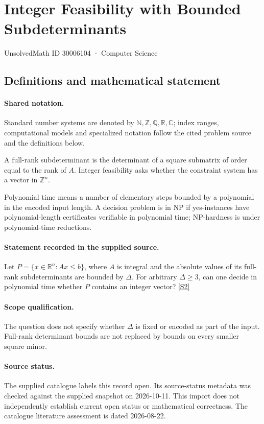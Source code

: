 \documentclass[11pt]{article}
\newcommand{\sref}[2]{\hyperlink{source:#1:#2}{[S#2]}}
\begin{document}
\setcounter{section}{30006103}
\section{Integer Feasibility with Bounded Subdeterminants}\label{30006104}
{\small\sffamily UnsolvedMath ID 30006104 · Computer Science}
\subsection{Definitions and mathematical statement}

\paragraph{Shared notation.}Standard number systems are denoted by $\mathbb N,\mathbb Z,\mathbb Q,\mathbb R,\mathbb C$; index ranges, computational models and specialized notation follow the cited problem source and the definitions below.


A full-rank subdeterminant is the determinant of a square submatrix of order equal to the rank of $A$. Integer feasibility asks whether the constraint system has a vector in $\mathbb Z^n$.

Polynomial time means a number of elementary steps bounded by a polynomial in the encoded input length. A decision problem is in $\mathrm{NP}$ if yes-instances have polynomial-length certificates verifiable in polynomial time; NP-hardness is under polynomial-time reductions.
\paragraph{Statement recorded in the supplied source.}
Let $P=\{x\in\mathbb R^n:Ax\leq b\}$, where $A$ is integral and the absolute values of its full-rank subdeterminants are bounded by $\Delta$. For arbitrary $\Delta\geq3$, can one decide in polynomial time whether $P$ contains an integer vector? \sref{30006104}{2}
\paragraph{Scope qualification.}
The question does not specify whether $\Delta$ is fixed or encoded as part of the input. Full-rank determinant bounds are not replaced by bounds on every smaller square minor.
\paragraph{Source status.}
The supplied catalogue labels this record open. Its source-status metadata was checked against the supplied snapshot on 2026-10-11. This import does not independently establish current open status or mathematical correctness. The catalogue literature assessment is dated 2026-08-22.
\end{document}

